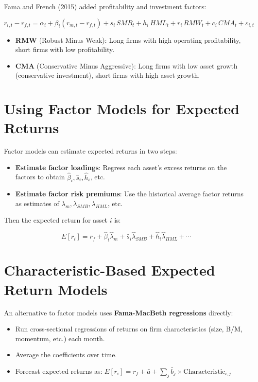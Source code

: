 \documentclass[11pt,letterpaper]{report}
\begin{document}
Fama and French (2015) added profitability and investment factors:

$$r_{i,t} - r_{f,t} = \alpha_i + \beta_i (r_{m,t} - r_{f,t}) + s_i \, SMB_t + h_i \, HML_t + r_i \, RMW_t + c_i \, CMA_t + \varepsilon_{i,t}$$

\begin{itemize}
  \item \textbf{RMW} (Robust Minus Weak): Long firms with high operating profitability, short firms with low profitability.
  \item \textbf{CMA} (Conservative Minus Aggressive): Long firms with low asset growth (conservative investment), short firms with high asset growth.
\end{itemize}

\section{Using Factor Models for Expected Returns}


Factor models can estimate expected returns in two steps:

\begin{itemize}
  \item \textbf{Estimate factor loadings}: Regress each asset's excess returns on the factors to obtain $\hat{\beta}_i, \hat{s}_i, \hat{h}_i$, etc.
  \item \textbf{Estimate factor risk premiums}: Use the historical average factor returns as estimates of $\lambda_m, \lambda_{SMB}, \lambda_{HML}$, etc.
\end{itemize}

Then the expected return for asset $i$ is:

$$E[r_i] = r_f + \hat{\beta}_i \hat{\lambda}_m + \hat{s}_i \hat{\lambda}_{SMB} + \hat{h}_i \hat{\lambda}_{HML} + \cdots$$

\section{Characteristic-Based Expected Return Models}


An alternative to factor models uses \textbf{Fama-MacBeth regressions} directly:

\begin{itemize}
  \item Run cross-sectional regressions of returns on firm characteristics (size, B/M, momentum, etc.) each month.
  \item Average the coefficients over time.
  \item Forecast expected returns as: $E[r_i] = r_f + \bar{a} + \sum_j \bar{b}_j \times \text{Characteristic}_{i,j}$
\end{itemize}
\end{document}
